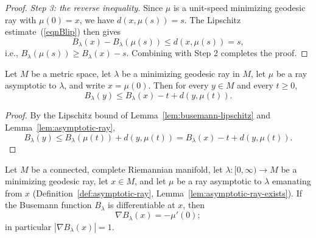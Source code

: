 \begin{proof}
{\em Step 3: the reverse inequality.} Since $\mu$ is a unit-speed
minimizing geodesic ray with $\mu(0)=x$, we have $d(x,\mu(s))=s$.
The Lipschitz estimate~(\ref{eqnBlip}) then gives
$$B_\lambda(x)-B_\lambda(\mu(s))\le d(x,\mu(s))=s,$$
i.e., $B_\lambda(\mu(s))\ge B_\lambda(x)-s$. Combining with Step 2
completes the proof.
\end{proof}

\begin{corollary}
\label{cor:asymptotic-ray-busemann-bound}
\leanok
{}
Let $M$ be a metric space, let $\lambda$ be a minimizing geodesic
ray in $M$, let $\mu$ be a ray asymptotic to $\lambda$, and write
$x=\mu(0)$. Then for every $y\in M$ and every $t\ge 0$,
$$B_\lambda(y)\le B_\lambda(x)-t+d(y,\mu(t)).$$
\end{corollary}

\begin{proof}
\leanok
{}
By the Lipschitz bound of Lemma~\ref{lem:busemann-lipschitz} and
Lemma~\ref{lem:asymptotic-ray},
$$B_\lambda(y)\le B_\lambda(\mu(t))+d(y,\mu(t))
=B_\lambda(x)-t+d(y,\mu(t)).$$
\end{proof}

\begin{lemma}
\label{lem:busemann-gradient-norm-one}
Let $M$ be a connected, complete Riemannian manifold, let $\lambda\colon
[0,\infty)\to M$ be a minimizing geodesic ray, let $x\in M$, and
let $\mu$ be a ray asymptotic to $\lambda$ emanating from $x$
(Definition~\ref{def:asymptotic-ray},
Lemma~\ref{lem:asymptotic-ray-exists}). If the Busemann function
$B_\lambda$ is differentiable at $x$, then
$$\nabla B_\lambda(x)=-\mu'(0);$$
in particular $|\nabla B_\lambda(x)|=1$.
\end{lemma}

